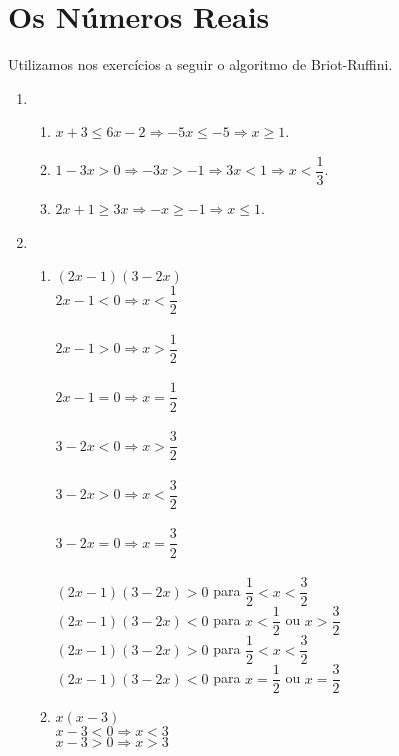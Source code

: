 \section{Os Números Reais}
Utilizamos nos exercícios a seguir o algoritmo de Briot-Ruffini.

\begin{enumerate}
	\setcounter{enumi}{0}
	\item
		\begin{enumerate}\addtocounter{enumii}{3}
		\item
			$x + 3 \leq 6x - 2 \Rightarrow -5x \leq -5 \Rightarrow x \geq 1$.
		\item
			$1 - 3x > 0 \Rightarrow -3x > -1 \Rightarrow 3x < 1 \Rightarrow x < \dfrac{1}{3}$.
		\item
		$2x + 1 \geq 3x \Rightarrow -x \geq -1 \Rightarrow x \leq 1$.
		\end{enumerate}
	\item
		\begin{enumerate}\addtocounter{enumii}{8}
		\item
		$(2x - 1)(3 - 2x)$\\
		$2x - 1 < 0 \Rightarrow x < \dfrac{1}{2}$\\\\
		$2x - 1 > 0 \Rightarrow x > \dfrac{1}{2}$\\\\
		$2x - 1 = 0 \Rightarrow x = \dfrac{1}{2}$\\\\
		$3 - 2x < 0 \Rightarrow x > \dfrac{3}{2}$\\\\
		$3 - 2x > 0 \Rightarrow x < \dfrac{3}{2}$\\\\
		$3 - 2x = 0 \Rightarrow x = \dfrac{3}{2}$\\\\
		$(2x - 1)(3 - 2x) > 0$ para $\dfrac{1}{2} < x < \dfrac{3}{2}$\\
		$(2x - 1)(3 - 2x) < 0$ para $x < \dfrac{1}{2} $ ou $x > \dfrac{3}{2}$\\
		$(2x - 1)(3 - 2x) > 0$ para $\dfrac{1}{2} < x < \dfrac{3}{2}$\\
		$(2x - 1)(3 - 2x) < 0$ para $x = \dfrac{1}{2}$ ou $x = \dfrac{3}{2}$
		\item
		$x(x - 3)$\\
		$x - 3 < 0 \Rightarrow x < 3$ \\
		$x - 3 > 0 \Rightarrow x > 3$ \\

\end{enumerate}
\end{enumerate}
